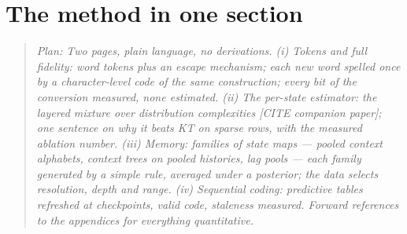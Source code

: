 \documentclass[11pt]{article}
\newcommand{\planned}[1]{\begin{quote}\small\itshape Plan: #1\end{quote}}
\begin{document}
\section{The method in one section}
\planned{Two pages, plain language, no derivations.  (i) Tokens and
full fidelity: word tokens plus an escape mechanism; each new word
spelled once by a character-level code of the same construction;
every bit of the conversion measured, none estimated.  (ii) The
per-state estimator: the layered mixture over distribution
complexities [CITE companion paper]; one sentence on why it beats KT
on sparse rows, with the measured ablation number.  (iii) Memory:
families of state maps --- pooled context alphabets, context trees on
pooled histories, lag pools --- each family generated by a simple
rule, averaged under a posterior; the data selects resolution, depth
and range.  (iv) Sequential coding: predictive tables refreshed at
checkpoints, valid code, staleness measured.  Forward references to
the appendices for everything quantitative.}
\end{document}
